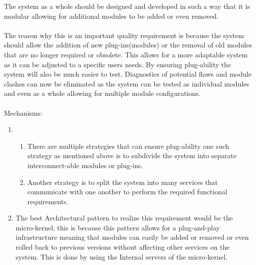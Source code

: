 \vspace{0.5 cm}
The system as a whole should be designed and developed in such a way that it is modular allowing for additional modules to be added or even removed.\\\\
The reason why this is an important quality requirement is because the system should allow the addition of new plug-ins(modules) or the removal of old modules that are no longer required or obsolete. This allows for a more adaptable system as it can be adjusted to a specific users needs. By ensuring plug-ability the system will also be much easier to test. Diagnostics of potential flaws and module clashes can now be eliminated as the system can be tested as individual modules and even as a whole allowing for multiple module configurations. \\\\
Mechanisms:
	\begin{enumerate}
		\item \begin{enumerate}
			\item There are multiple strategies that can ensure plug-ability one such strategy as mentioned above is to subdivide the system into separate interconnect-able modules or plug-ins. \\
			\item Another strategy is to split the system into many services that communicate with one another to perform the required functional requirements.\\
		\end{enumerate}
		\item The best Architectural pattern to realize this requirement would be the micro-kernel, this is because this pattern allows for a plug-and-play infrastructure meaning that modules can easily be added or removed or even rolled back to previous versions without affecting other services on the system. This is done by using the Internal servers of the micro-kernel. 
	\end{enumerate}
